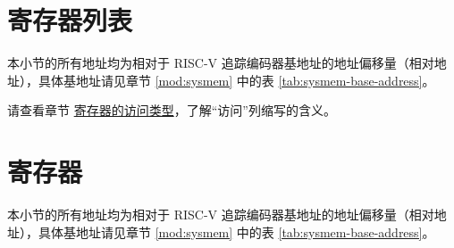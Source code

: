 \documentclass[main\_\_CN.tex]{subfiles}
\begin{document}



\clearpage
\hypertarget{riscvtracenc-reg-summ}{}
\section{寄存器列表}
\label{sec:riscvtracenc-reg-summ}

本小节的所有地址均为相对于 RISC-V 追踪编码器基地址的地址偏移量（相对地址），具体基地址请见章节 \ref{mod:sysmem} \textit{} 中的表 \ref{tab:sysmem-base-address}。

请查看章节 \hyperref[glossary-access-types]{寄存器的访问类型}，了解“访问”列缩写的含义。






\clearpage
\section{寄存器}

本小节的所有地址均为相对于 RISC-V 追踪编码器基地址的地址偏移量（相对地址），具体基地址请见章节 \ref{mod:sysmem} \textit{} 中的表 \ref{tab:sysmem-base-address}。


\end{document}
